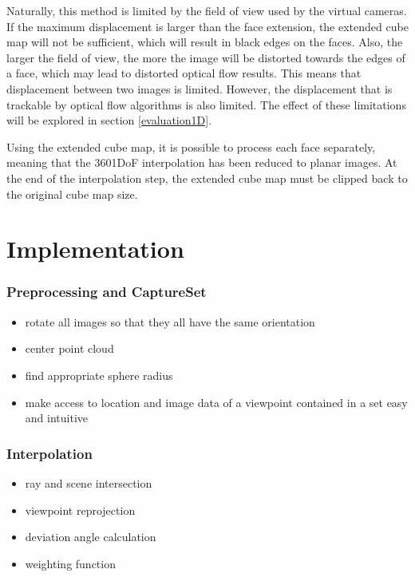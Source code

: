 Naturally, this method is limited by the field of view used by the virtual cameras. If the maximum displacement is larger than the face extension, the extended cube map will not be sufficient, which will result in black edges on the faces. Also, the larger the field of view, the more the image will be distorted towards the edges of a face, which may lead to distorted optical flow results. This means that displacement between two images is limited. However, the displacement that is trackable by optical flow algorithms is also limited. The effect of these limitations will be explored in section \ref{evaluation1D}.

Using the extended cube map, it is possible to process each face separately, meaning that the 360\degree 1DoF interpolation has been reduced to planar images. At the end of the interpolation step, the extended cube map must be clipped back to the original cube map size.


\section{Implementation}

\subsubsection{Preprocessing and CaptureSet}
\begin{itemize}
  \item rotate all images so that they all have the same orientation
  \item center point cloud
  \item find appropriate sphere radius
  \item make access to location and image data of a viewpoint contained in a set easy and intuitive
\end{itemize}

\subsubsection{Interpolation}
\begin{itemize}
  \item ray and scene intersection
  \item viewpoint reprojection
  \item deviation angle calculation
  \item weighting function
\end{itemize}

